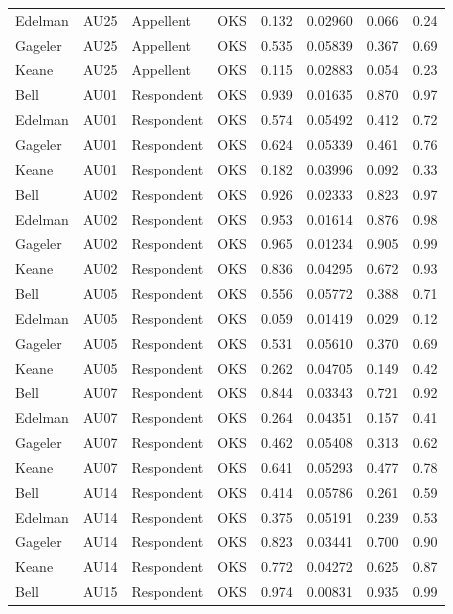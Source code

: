 \documentclass{monashthesis}
\begin{document}
\begin{center}
\begin{longtable}{llllllll}
Edelman & AU25 & Appellent & OKS & 0.132 & 0.02960 & 0.066 & 0.24 \\
Gageler & AU25 & Appellent & OKS & 0.535 & 0.05839 & 0.367 & 0.69 \\
Keane & AU25 & Appellent & OKS & 0.115 & 0.02883 & 0.054 & 0.23 \\
Bell & AU01 & Respondent & OKS & 0.939 & 0.01635 & 0.870 & 0.97 \\
Edelman & AU01 & Respondent & OKS & 0.574 & 0.05492 & 0.412 & 0.72 \\
Gageler & AU01 & Respondent & OKS & 0.624 & 0.05339 & 0.461 & 0.76 \\
Keane & AU01 & Respondent & OKS & 0.182 & 0.03996 & 0.092 & 0.33 \\
Bell & AU02 & Respondent & OKS & 0.926 & 0.02333 & 0.823 & 0.97 \\
Edelman & AU02 & Respondent & OKS & 0.953 & 0.01614 & 0.876 & 0.98 \\
Gageler & AU02 & Respondent & OKS & 0.965 & 0.01234 & 0.905 & 0.99 \\
Keane & AU02 & Respondent & OKS & 0.836 & 0.04295 & 0.672 & 0.93 \\
Bell & AU05 & Respondent & OKS & 0.556 & 0.05772 & 0.388 & 0.71 \\
Edelman & AU05 & Respondent & OKS & 0.059 & 0.01419 & 0.029 & 0.12 \\
Gageler & AU05 & Respondent & OKS & 0.531 & 0.05610 & 0.370 & 0.69 \\
Keane & AU05 & Respondent & OKS & 0.262 & 0.04705 & 0.149 & 0.42 \\
Bell & AU07 & Respondent & OKS & 0.844 & 0.03343 & 0.721 & 0.92 \\
Edelman & AU07 & Respondent & OKS & 0.264 & 0.04351 & 0.157 & 0.41 \\
Gageler & AU07 & Respondent & OKS & 0.462 & 0.05408 & 0.313 & 0.62 \\
Keane & AU07 & Respondent & OKS & 0.641 & 0.05293 & 0.477 & 0.78 \\
Bell & AU14 & Respondent & OKS & 0.414 & 0.05786 & 0.261 & 0.59 \\
Edelman & AU14 & Respondent & OKS & 0.375 & 0.05191 & 0.239 & 0.53 \\
Gageler & AU14 & Respondent & OKS & 0.823 & 0.03441 & 0.700 & 0.90 \\
Keane & AU14 & Respondent & OKS & 0.772 & 0.04272 & 0.625 & 0.87 \\
Bell & AU15 & Respondent & OKS & 0.974 & 0.00831 & 0.935 & 0.99 \\

\end{longtable}
\end{center}
\end{document}
